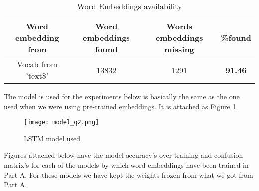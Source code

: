\documentclass{article}
\begin{document}
\begin{table}[h!]
\begin{center}
\begin{tabular}{ |c|c|c|c|} 
 \hline
 Word embedding from & Word embeddings found & Words embeddings missing  & \%found\\ 
 \hline \hline
 Vocab from 'text8' & 13832 & 1291  & \textbf{91.46}\\ 
 \hline

\hline
\end{tabular}
\caption{Word Embeddings availability }
\label{tab:miss_words1}
\end{center}
\end{table}
\vspace{-1.6em}
\noindent
The model is used for the experiments below is basically the same as the one used when we were using pre-trained embeddings. It is attached as Figure \ref{fig:model_used_q2}.

\begin{figure}[H]
    \centering
    \texttt{[image: model\_q2.png]}
    \caption{LSTM model used}
    \label{fig:model_used_q2}
\end{figure}

\noindent
Figures attached below have the model accuracy's over training and confusion matrix's for each of the models by which word embeddings have been trained in Part A. For these models we have kept the weights frozen from what we got from Part A.
\newpage
\end{document}
